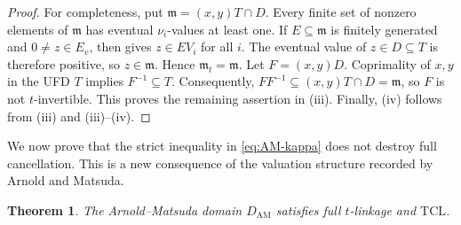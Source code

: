 \documentclass[11pt]{amsart}
\newtheorem{theorem}{Theorem}[section]
\theoremstyle{definition}
\theoremstyle{remark}
\newcommand{\TCL}{\mathrm{TCL}}
\begin{document}
\begin{proof}
For completeness, put $\mathfrak m=(x,y)T\cap D$.
Every finite set of nonzero elements of $\mathfrak m$ has eventual
$\nu_i$-values at least one.  If $E\subseteq\mathfrak m$ is finitely
generated and $0\ne z\in E_v$, then
 gives $z\in EV_i$ for all $i$.
The eventual value of $z\in D\subseteq T$ is therefore positive, so
$z\in\mathfrak m$.  Hence $\mathfrak m_t=\mathfrak m$.
Let $F=(x,y)D$.  Coprimality of $x,y$ in the UFD $T$ implies
$F^{-1}\subseteq T$.  Consequently,
$FF^{-1}\subseteq(x,y)T\cap D=\mathfrak m$, so $F$ is not
$t$-invertible.  This proves the remaining assertion in (iii).
Finally, (iv) follows from (iii) and
(iii)--(iv).
\end{proof}

We now prove that the strict inequality in \eqref{eq:AM-kappa} does not
destroy full cancellation.  This is a new consequence of the valuation
structure recorded by Arnold and Matsuda.

\begin{theorem}\label{thm:AM-TCL}
The Arnold--Matsuda domain $D_{\mathrm{AM}}$ satisfies full $t$-linkage and
$\TCL$.
\end{theorem}
\end{document}
